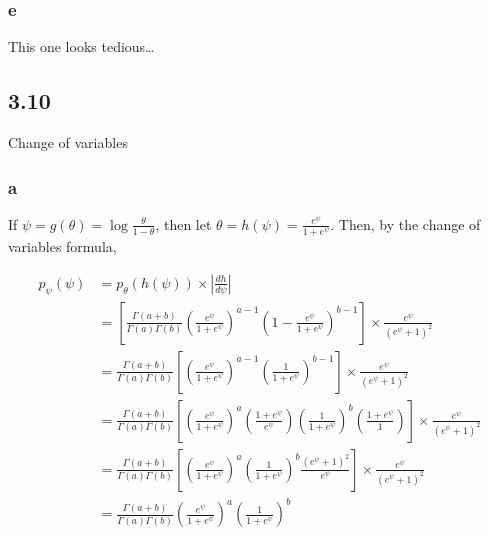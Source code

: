 \documentclass[]{article}
\begin{document}
\hypertarget{e-2}{%
\subsubsection{e}\label{e-2}}

This one looks tedious\ldots{}

\hypertarget{section-6}{%
\subsection{3.10}\label{section-6}}

Change of variables

\hypertarget{a-5}{%
\subsubsection{a}\label{a-5}}

If \(\psi = g(\theta) = \log \frac{\theta}{1 - \theta}\), then let
\(\theta = h(\psi) = \frac{e^\psi}{1 + e^\psi}\). Then, by the change of
variables formula,

\begin{align}
p_{\psi}(\psi) &= p_{\theta}(h(\psi)) \times \left| \frac{dh}{d\psi} \right| \\
&= \left[ \frac{\Gamma(a + b)}{\Gamma(a) \Gamma(b)} \left( \frac{e^\psi}{1 + e^\psi}  \right)^{a - 1} \left( 1 - \frac{e^\psi}{1 + e^\psi} \right)^{b - 1} \right] \times \frac{e^\psi}{(e^\psi + 1)^2} \\
&= \frac{\Gamma(a + b)}{\Gamma(a)\Gamma(b)} \left[ \left( \frac{e^\psi}{1 + e^\psi}  \right)^{a - 1} \left( \frac{1}{1 + e^\psi} \right)^{b - 1} \right] \times \frac{e^\psi}{(e^\psi + 1)^2} \\
&= \frac{\Gamma(a + b)}{\Gamma(a)\Gamma(b)} \left[ \left( \frac{e^\psi}{1 + e^\psi}  \right)^a \left( \frac{1 + e^\psi}{e^\psi} \right) \left( \frac{1}{1 + e^\psi} \right)^b \left(\frac{1 + e^\psi}{1} \right) \right] \times \frac{e^\psi}{(e^\psi + 1)^2} \\
&= \frac{\Gamma(a + b)}{\Gamma(a)\Gamma(b)} \left[ \left( \frac{e^\psi}{1 + e^\psi}  \right)^a \left( \frac{1}{1 + e^\psi} \right)^b \frac{(e^\psi + 1)^2}{e^\psi} \right] \times \frac{e^\psi}{(e^\psi + 1)^2} \\
&= \frac{\Gamma(a + b)}{\Gamma(a)\Gamma(b)} \left( \frac{e^\psi}{1 + e^\psi}  \right)^a \left( \frac{1}{1 + e^\psi} \right)^b
\end{align}
\end{document}
